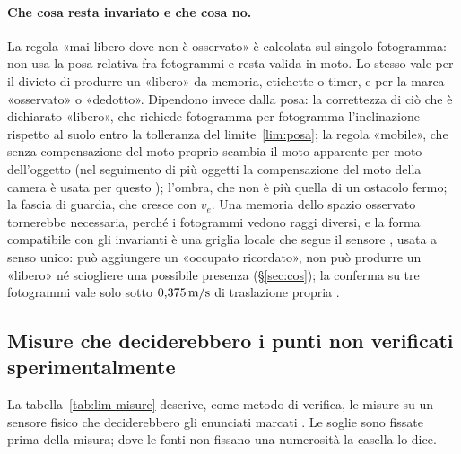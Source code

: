 \paragraph{Che cosa resta invariato e che cosa no.} La regola «mai libero dove non è osservato» è calcolata sul singolo fotogramma: non usa la posa relativa fra fotogrammi e resta valida in moto. Lo stesso vale per il divieto di produrre un «libero» da memoria, etichette o timer, e per la marca «osservato» o «dedotto». Dipendono invece dalla posa: la correttezza di ciò che è dichiarato «libero», che richiede fotogramma per fotogramma l'inclinazione rispetto al suolo entro la tolleranza del limite~\ref{lim:posa}; la regola «mobile», che senza compensazione del moto proprio scambia il moto apparente per moto dell'oggetto (nel seguimento di più oggetti la compensazione del moto della camera è usata per questo \cite{aharon2022}); l'ombra, che non è più quella di un ostacolo fermo; la fascia di guardia, che cresce con $v_e$. Una memoria dello spazio osservato tornerebbe necessaria, perché i fotogrammi vedono raggi diversi, e la forma compatibile con gli invarianti è una griglia locale che segue il sensore \cite{usenko2017}, usata a senso unico: può aggiungere un «occupato ricordato», non può produrre un «libero» né sciogliere una possibile presenza (\S\ref{sec:cos}); la conferma su tre fotogrammi vale solo sotto $0{,}375\,\mathrm{m/s}$ di traslazione propria .

\subsection{Misure che deciderebbero i punti non verificati sperimentalmente}\label{sec:lim-misure}

La tabella~\ref{tab:lim-misure} descrive, come metodo di verifica, le misure su un sensore fisico che deciderebbero gli enunciati marcati . Le soglie sono fissate prima della misura; dove le fonti non fissano una numerosità la casella lo dice.

